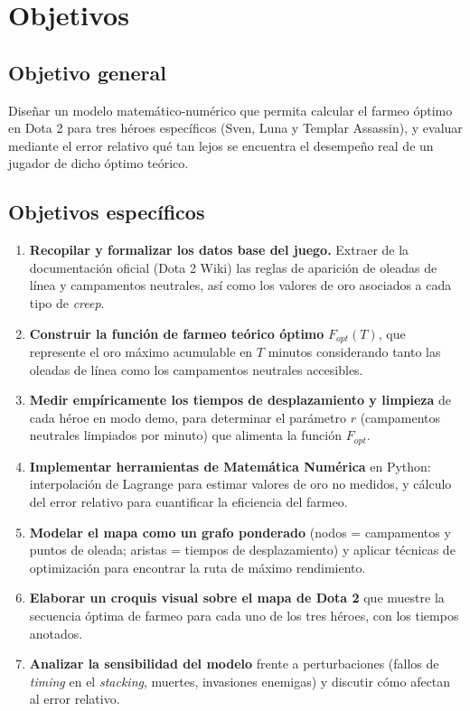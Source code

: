 \section{Objetivos}

\subsection{Objetivo general}

Diseñar un modelo matemático-numérico que permita calcular el farmeo óptimo en Dota 2 para tres héroes específicos (Sven, Luna y Templar Assassin), y evaluar mediante el error relativo qué tan lejos se encuentra el desempeño real de un jugador de dicho óptimo teórico.

\subsection{Objetivos específicos}

\begin{enumerate}
    \item \textbf{Recopilar y formalizar los datos base del juego.} Extraer de la documentación oficial (Dota 2 Wiki) las reglas de aparición de oleadas de línea y campamentos neutrales, así como los valores de oro asociados a cada tipo de \textit{creep}.
    
    \item \textbf{Construir la función de farmeo teórico óptimo} \(F_{opt}(T)\), que represente el oro máximo acumulable en \(T\) minutos considerando tanto las oleadas de línea como los campamentos neutrales accesibles.
    
    \item \textbf{Medir empíricamente los tiempos de desplazamiento y limpieza} de cada héroe en modo demo, para determinar el parámetro \(r\) (campamentos neutrales limpiados por minuto) que alimenta la función \(F_{opt}\).
    
    \item \textbf{Implementar herramientas de Matemática Numérica} en Python: interpolación de Lagrange para estimar valores de oro no medidos, y cálculo del error relativo para cuantificar la eficiencia del farmeo.
    
    \item \textbf{Modelar el mapa como un grafo ponderado} (nodos = campamentos y puntos de oleada; aristas = tiempos de desplazamiento) y aplicar técnicas de optimización para encontrar la ruta de máximo rendimiento.
    
    \item \textbf{Elaborar un croquis visual sobre el mapa de Dota 2} que muestre la secuencia óptima de farmeo para cada uno de los tres héroes, con los tiempos anotados.
    
    \item \textbf{Analizar la sensibilidad del modelo} frente a perturbaciones (fallos de \textit{timing} en el \textit{stacking}, muertes, invasiones enemigas) y discutir cómo afectan al error relativo.
\end{enumerate}